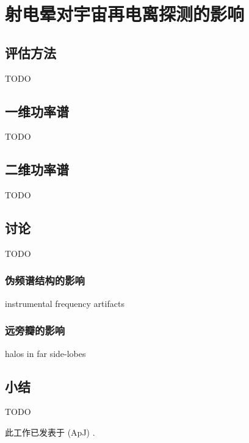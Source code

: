 
\chapter{射电晕对宇宙再电离探测的影响}
\label{chap:halo}

\section{评估方法}

TODO


\section{一维功率谱}

TODO


\section{二维功率谱}

TODO


\section{讨论}

TODO

\subsection{伪频谱结构的影响}

instrumental frequency artifacts

\subsection{远旁瓣的影响}

halos in far side-lobes


\section{小结}

TODO

此工作已发表于 \apj{} (ApJ) \cite{li.halo}.


